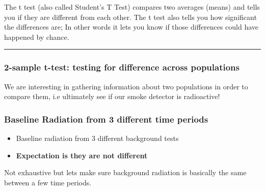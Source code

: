 \documentclass[11pt]{article}
\providecommand{\tightlist}{%
      \setlength{\itemsep}{0pt}\setlength{\parskip}{0pt}}
\begin{document}
The t test (also called Student's T Test) compares two averages (means)
and tells you if they are different from each other. The t test also
tells you how significant the differences are; In other words it lets
you know if those differences could have happened by chance.

\begin{center}\rule{0.5\linewidth}{\linethickness}\end{center}

\subsubsection{2-sample t-test: testing for difference across
populations}\label{sample-t-test-testing-for-difference-across-populations}

We are interesting in gathering information about two populations in
order to compare them, i.e ultimately see if our smoke detector is
radioactive!

    \subsubsection{Baseline Radiation from 3 different time
periods}\label{baseline-radiation-from-3-different-time-periods}

\begin{itemize}
\tightlist
\item
  Baseline radiation from 3 different background tests
\item
  \textbf{Expectation is they are not different}
\end{itemize}

Not exhaustive but lets make sure background radiation is basically the
same between a few time periods.
\end{document}
